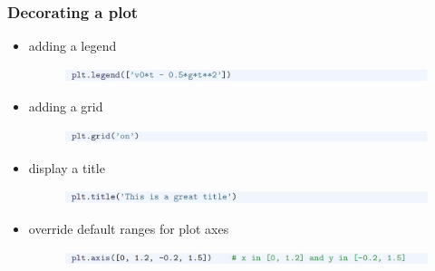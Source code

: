 \documentclass[14pt]{beamer}
\begin{document}

\begin{frame}[fragile]
\frametitle{Decorating a plot}
\begin{itemize}
\item adding a legend
\vspace*{-5mm}
\begin{figure}[ht]
	\centering
	\includegraphics[width=\textwidth]{figures/LLp24c}
\end{figure}

\item adding a grid
\vspace*{-5mm}
\begin{figure}[ht]
	\centering
	\includegraphics[width=\textwidth]{figures/LLp24d}
\end{figure}
\item display a title
\vspace*{-5mm}
\begin{figure}[ht]
	\centering
	\includegraphics[width=\textwidth]{figures/LLp24e}
\end{figure}
\item override default ranges for plot axes
\vspace*{-5mm}
\begin{figure}[ht]
	\centering
	\includegraphics[width=\textwidth]{figures/LLp24f}
\end{figure}
\end{itemize}

\end{frame}

\end{document}
